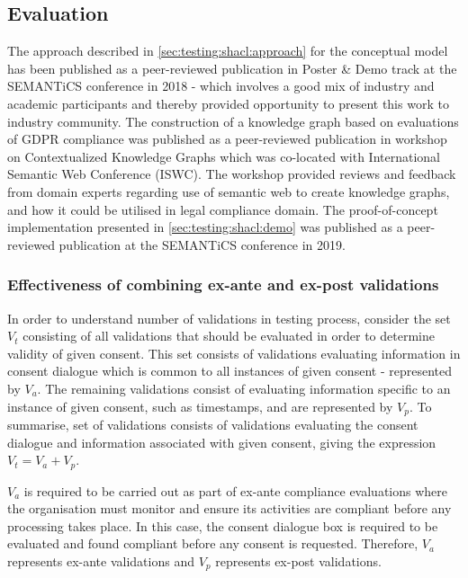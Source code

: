 \subsection{Evaluation}
The approach described in \autoref{sec:testing:shacl:approach} for the conceptual model has been published as a peer-reviewed publication \cite{pandit_exploring_2018} in Poster \& Demo track at the SEMANTiCS conference in 2018 - which involves a good mix of industry and academic participants and thereby provided opportunity to present this work to industry community.
The construction of a knowledge graph based on evaluations of GDPR compliance was published as a peer-reviewed publication \cite{pandit_towards_2018} in  workshop on Contextualized Knowledge Graphs which was co-located with International Semantic Web Conference (ISWC). The workshop provided reviews and feedback from domain experts regarding use of semantic web to create knowledge graphs, and how it could be utilised in legal compliance domain. 
The proof-of-concept implementation presented in \autoref{sec:testing:shacl:demo} was published as a peer-reviewed publication \cite{pandit_test-driven_2019} at the SEMANTiCS conference in 2019.

\subsubsection*{Effectiveness of combining ex-ante and ex-post validations}
In order to understand number of validations in testing process, consider the set $V_{t}$ consisting of all validations that should be evaluated in order to determine validity of given consent. This set consists of validations evaluating information in consent dialogue which is common to all instances of given consent - represented by $V_{a}$. The remaining validations consist of evaluating information specific to an instance of given consent, such as timestamps, and are represented by $V_{p}$. 
To summarise, set of validations consists of validations evaluating the consent dialogue and information associated with given consent, giving the expression $V_{t} = V_{a} + V_{p}$.

$V_{a}$ is required to be carried out as part of ex-ante compliance evaluations where the organisation must monitor and ensure its activities are compliant before any processing takes place. In this case, the consent dialogue box is required to be evaluated and found compliant before any consent is requested. Therefore, $V_{a}$ represents ex-ante validations and $V_{p}$ represents ex-post validations.

